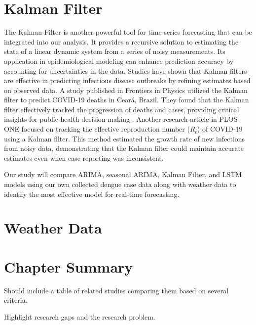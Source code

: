 \section{Kalman Filter}
The Kalman Filter is another powerful tool for time-series forecasting that can be integrated into our analysis. It provides a recursive solution to estimating the state of a linear dynamic system from a series of noisy measurements. Its application in epidemiological modeling can enhance prediction accuracy by accounting for uncertainties in the data\cite{li2022applications}. Studies have shown that Kalman filters are effective in predicting infectious disease outbreaks by refining estimates based on observed data. A study published in Frontiers in Physics utilized the Kalman filter to predict COVID-19 deaths in Ceará, Brazil. They found that the Kalman filter effectively tracked the progression of deaths and cases, providing critical insights for public health decision-making \cite{ahmadini2021analysis}. Another research article in PLOS ONE focused on tracking the effective reproduction number ($R_t$) of COVID-19 using a Kalman filter. This method estimated the growth rate of new infections from noisy data, demonstrating that the Kalman filter could maintain accurate estimates even when case reporting was inconsistent\cite{arroyo2021tracking}.

Our study will compare ARIMA, seasonal ARIMA, Kalman Filter, and LSTM models using our own collected dengue case data along with weather data to identify the most effective model for real-time forecasting.

\section{Weather Data}

\section{Chapter Summary}
Should include a table of related studies comparing them based on several criteria.

Highlight research gaps and the research problem.














